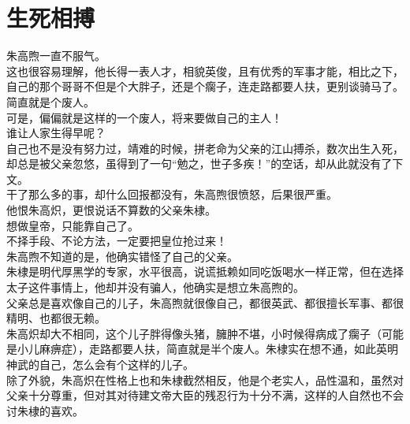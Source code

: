 \section{生死相搏}
\ifnum{}
	\begin{multicols}{\theparacolNo}
\fi
朱高煦一直不服气。\\

这也很容易理解，他长得一表人才，相貌英俊，且有优秀的军事才能，相比之下，自己的那个哥哥不但是个大胖子，还是个瘸子，连走路都要人扶，更别谈骑马了。\\

简直就是个废人。\\

可是，偏偏就是这样的一个废人，将来要做自己的主人！\\

谁让人家生得早呢？\\

自己也不是没有努力过，靖难的时候，拼老命为父亲的江山搏杀，数次出生入死，却总是被父亲忽悠，虽得到了一句“勉之，世子多疾！”的空话，却从此就没有了下文。\\

干了那么多的事，却什么回报都没有，朱高煦很愤怒，后果很严重。\\

他恨朱高炽，更恨说话不算数的父亲朱棣。\\

想做皇帝，只能靠自己了。\\

不择手段、不论方法，一定要把皇位抢过来！\\

朱高煦不知道的是，他确实错怪了自己的父亲。\\

朱棣是明代厚黑学的专家，水平很高，说谎抵赖如同吃饭喝水一样正常，但在选择太子这件事情上，他却并没有骗人，他确实是想立朱高煦的。\\

父亲总是喜欢像自己的儿子，朱高煦就很像自己，都很英武、都很擅长军事、都很精明、也都很无赖。\\

朱高炽却大不相同，这个儿子胖得像头猪，臃肿不堪，小时候得病成了瘸子（可能是小儿麻痹症），走路都要人扶，简直就是半个废人。朱棣实在想不通，如此英明神武的自己，怎么会有个这样的儿子。\\

除了外貌，朱高炽在性格上也和朱棣截然相反，他是个老实人，品性温和，虽然对父亲十分尊重，但对其对待建文帝大臣的残忍行为十分不满，这样的人自然也不会讨朱棣的喜欢。\\


\end{multicols}
